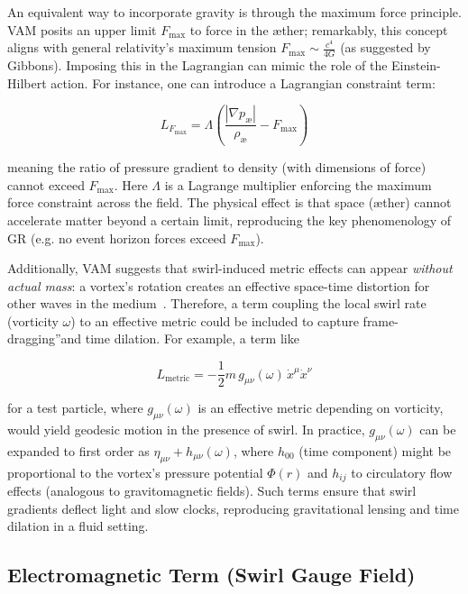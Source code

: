 An equivalent way to incorporate gravity is through the maximum force principle. VAM posits an upper limit $F_{\max}$ to force in the æther; remarkably, this concept aligns with general relativity's maximum tension $F_{\max} \sim \frac{c^4}{4G}$ (as suggested by Gibbons). Imposing this in the Lagrangian can mimic the role of the Einstein-Hilbert action. For instance, one can introduce a Lagrangian constraint term:

\begin{equation}
    L_{F_{\max}} = \Lambda\left(\frac{|\nabla p_{\text{\ae}}|}{\rho_{\text{\ae}}} - F_{\max}\right)
    \label{eq:max-force-constraint}
\end{equation}

meaning the ratio of pressure gradient to density (with dimensions of force) cannot exceed $F_{\max}$. Here $\Lambda$ is a Lagrange multiplier enforcing the maximum force constraint across the field. The physical effect is that space (æther) cannot accelerate matter beyond a certain limit, reproducing the key phenomenology of GR (e.g. no event horizon forces exceed $F_{\max}$).


Additionally, VAM suggests that swirl-induced metric effects can appear \textit{without actual mass}: a vortex's rotation creates an effective space-time distortion for other waves in the medium~\cite{VAM3}. Therefore, a term coupling the local swirl rate (vorticity $\omega$) to an effective metric could be included to capture \grqq frame-dragging\textquotedblright and time dilation. For example, a term like

\begin{equation}
    L_{\text{metric}} = -\frac{1}{2}m\, g_{\mu\nu}(\omega) \, \dot{x}^\mu \dot{x}^\nu
    \label{eq:metric-vorticity}
\end{equation}

for a test particle, where $g_{\mu\nu}(\omega)$ is an effective metric depending on vorticity, would yield geodesic motion in the presence of swirl. In practice, $g_{\mu\nu}(\omega)$ can be expanded to first order as $\eta_{\mu\nu} + h_{\mu\nu}(\omega)$, where $h_{00}$ (time component) might be proportional to the vortex's pressure potential $\Phi(r)$ and $h_{ij}$ to circulatory flow effects (analogous to gravitomagnetic fields). Such terms ensure that swirl gradients deflect light and slow clocks, reproducing gravitational lensing and time dilation in a fluid setting.


\subsection{Electromagnetic Term (Swirl Gauge Field)}

